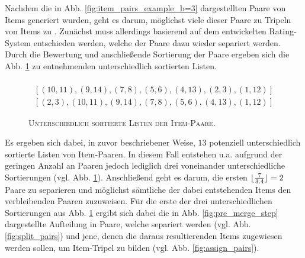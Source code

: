 Nachdem die in Abb. \ref{fig:item_pairs_example_b=3} dargestellten Paare von Items generiert wurden, geht es darum,
möglichst viele dieser Paare zu Tripeln von Items zu . Zunächst muss allerdings basierend auf dem entwickelten Rating-System entschieden werden, welche der Paare dazu wieder separiert werden. Durch die Bewertung und anschließende Sortierung der Paare ergeben sich die Abb. \ref{fig:lists_of_pairs} zu entnehmenden unterschiedlich
sortierten Listen.
\begin{figure}[H]
\begin{gather*}
  [(2, 3), (4, 13), (10, 11), (9, 14), (7, 8), (5, 6), (1, 12)] \\
  [(10, 11), (9, 14), (7, 8), (5, 6), (4, 13), (2, 3), (1, 12)] \\
  [(2, 3), (10, 11), (9, 14), (7, 8), (5, 6), (4, 13), (1, 12)]
\end{gather*}
\caption{\textsc{Unterschiedlich sortierte Listen der Item-Paare}.}
\label{fig:lists_of_pairs}
\end{figure}
Es ergeben sich dabei, in zuvor beschriebener Weise, $13$ potenziell unterschiedlich sortierte Listen von Item-Paaren.
In diesem Fall entstehen u.a. aufgrund der geringen Anzahl an Paaren jedoch lediglich drei voneinander unterschiedliche
Sortierungen (vgl. Abb. \ref{fig:lists_of_pairs}).
Anschließend geht es darum, die ersten $\lfloor\frac{7}{3.4}\rfloor = 2$ Paare zu separieren und möglichst sämtliche der dabei entstehenden Items den verbleibenden Paaren zuzuweisen. Für die erste der drei unterschiedlichen Sortierungen aus Abb. \ref{fig:lists_of_pairs} ergibt sich dabei die in Abb. \ref{fig:pre_merge_step} dargestellte Aufteilung in Paare, welche separiert werden (vgl. Abb. \ref{fig:split_pairs}) und jene, denen die daraus resultierenden Items zugewiesen werden sollen,
um Item-Tripel zu bilden (vgl. Abb. \ref{fig:assign_pairs}).

